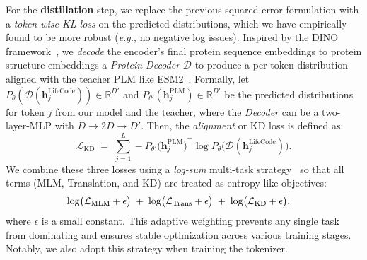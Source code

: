For the \textbf{distillation} step, we replace the previous squared-error formulation with a \emph{token-wise KL loss} on the predicted distributions, which we have empirically found to be more robust (\textit{e.g.}, no negative log issues). Inspired by the DINO framework~\citep{oquab2024dinov2}, we \emph{decode} the encoder’s final protein sequence embeddings to protein structure embeddings a \textit{Protein Decoder} $\mathcal{D}$ to produce a per-token distribution aligned with the teacher PLM like ESM2~\citep{lin2022ESM2}. Formally, let \(P_\theta(\mathcal{D} (\mathbf{h}_j^\mathrm{LifeCode})) \in \mathbb{R}^{D'}\) and \(P_{\theta'}(\mathbf{h}_j^\mathrm{PLM}) \in \mathbb{R}^{D'}\) be the predicted distributions for token \(j\) from our model and the teacher, where the \textit{Decoder} can be a two-layer-MLP with \(D \rightarrow 2D \rightarrow D'\). Then, the \emph{alignment} or KD loss is defined as:
\begin{equation}
    \label{eq:tokenwise_kl}
    \mathcal{L}_\mathrm{KD} \;=\; \sum_{j=1}^{L} 
    -P_{\theta'}\bigl(\mathbf{h}_j^\mathrm{PLM}\bigr)^\top \log P_{\theta}\bigl(\mathcal{D}( \mathbf{h}_j^\mathrm{LifeCode}) \bigr).
\end{equation}
We combine these three losses using a \textit{log-sum} multi-task strategy~\citep{lin2023dualmtl} so that all terms (MLM, Translation, and KD) are treated as entropy-like objectives:
\begin{equation}
    \hspace{-1.0em}
    \label{eq:loss_total}
    \log\bigl(\mathcal{L}_\mathrm{MLM} + \epsilon\bigr) 
    \;+\; \log\bigl(\mathcal{L}_\mathrm{Trans} + \epsilon\bigr)
    \;+\; \log\bigl(\mathcal{L}_\mathrm{KD} + \epsilon\bigr),
\end{equation}
where \(\epsilon\) is a small constant. This adaptive weighting prevents any single task from dominating and ensures stable optimization across various training stages. Notably, we also adopt this strategy when training the tokenizer.


